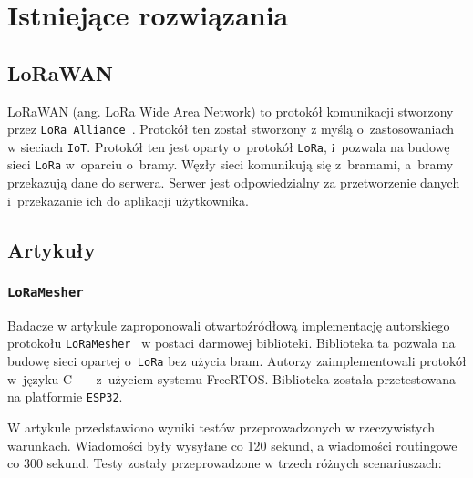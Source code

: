 \chapter{Istniejące rozwiązania}

\section{LoRaWAN}

LoRaWAN (ang. LoRa Wide Area Network) to protokół komunikacji stworzony przez \texttt{LoRa Alliance}~\cite{lora:about}.
Protokół ten został stworzony z myślą o~zastosowaniach w sieciach \texttt{IoT}.
Protokół ten jest oparty o~protokół \texttt{LoRa}, i~pozwala na budowę sieci \texttt{LoRa} w~oparciu o~bramy.
Węzły sieci komunikują się z~bramami, a~bramy przekazują dane do serwera.
Serwer jest odpowiedzialny za przetworzenie danych i~przekazanie ich do aplikacji użytkownika.




\section{Artykuły}
\subsection{\texttt{LoRaMesher}}
Badacze w artykule zaproponowali otwartoźródłową implementację autorskiego protokołu \texttt{LoRaMesher}~\cite{bib:loramesher} w postaci darmowej biblioteki.
Biblioteka ta pozwala na budowę sieci opartej o~\texttt{LoRa} bez użycia bram.
Autorzy zaimplementowali protokół w~języku C++ z~użyciem systemu FreeRTOS.
Biblioteka została przetestowana na platformie \texttt{ESP32}.

W artykule przedstawiono wyniki testów przeprowadzonych w rzeczywistych warunkach.
Wiadomości były wysyłane co 120 sekund, a wiadomości routingowe co 300 sekund.
Testy zostały przeprowadzone w trzech różnych scenariuszach:

